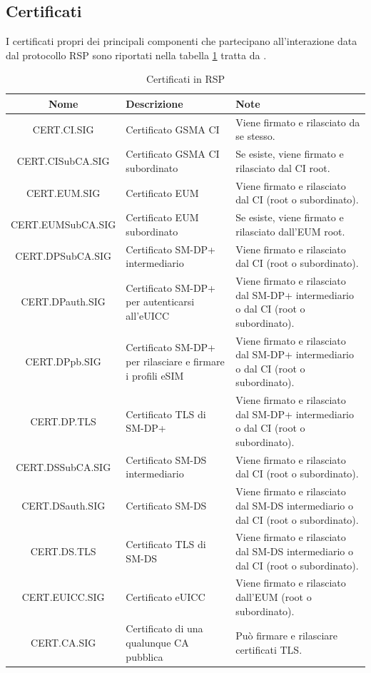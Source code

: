 \documentclass[10pt, oneside]{book}
\begin{document}
\subsection{Certificati}
I certificati propri dei principali componenti che partecipano all'interazione data dal protocollo RSP sono riportati nella tabella \ref{tab:cert} tratta da \cite{GSMA-docs-new}.\\
\begin{table}[h!]
\begin{center}
\captionsetup{skip=4pt}
\caption{Certificati in RSP}
\label{tab:cert}
\begin{tabularx}{\textwidth}{|c|X|X|}
\hline
\textbf{Nome} & \textbf{Descrizione} & \textbf{Note}\\
\hline
CERT.CI.SIG & Certificato GSMA CI & Viene firmato e rilasciato da se stesso.\\
\hline
CERT.CISubCA.SIG & Certificato GSMA CI subordinato & Se esiste, viene firmato e rilasciato dal CI root.\\
\hline
CERT.EUM.SIG & Certificato EUM & Viene firmato e rilasciato dal CI (root o subordinato).\\
\hline
CERT.EUMSubCA.SIG & Certificato EUM subordinato & Se esiste, viene firmato e rilasciato dall'EUM root.\\
\hline
CERT.DPSubCA.SIG & Certificato SM-DP+ intermediario & Viene firmato e rilasciato dal CI (root o subordinato).\\
\hline
CERT.DPauth.SIG & Certificato SM-DP+ per autenticarsi all'eUICC & Viene firmato e rilasciato dal SM-DP+ intermediario o dal CI (root o subordinato).\\
\hline
CERT.DPpb.SIG & Certificato SM-DP+ per rilasciare e firmare i profili eSIM & Viene firmato e rilasciato dal SM-DP+ intermediario o dal CI (root o subordinato).\\
\hline
CERT.DP.TLS & Certificato TLS di SM-DP+ & Viene firmato e rilasciato dal SM-DP+ intermediario o dal CI (root o subordinato).\\
\hline
CERT.DSSubCA.SIG & Certificato SM-DS intermediario & Viene firmato e rilasciato dal CI (root o subordinato).\\
\hline
CERT.DSauth.SIG & Certificato SM-DS & Viene firmato e rilasciato dal SM-DS intermediario o dal CI (root o subordinato).\\
\hline
CERT.DS.TLS & Certificato TLS di SM-DS & Viene firmato e rilasciato dal SM-DS intermediario o dal CI (root o subordinato).\\
\hline
CERT.EUICC.SIG & Certificato eUICC & Viene firmato e rilasciato dall'EUM (root o subordinato).\\
\hline
CERT.CA.SIG & Certificato di una qualunque CA pubblica & Può firmare e rilasciare certificati TLS.\\
\hline
\end{tabularx}
\end{center}
\end{table}
\end{document}
